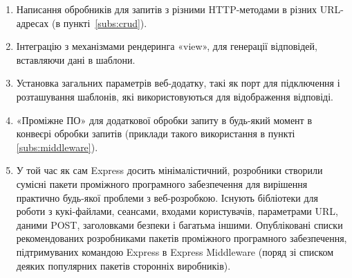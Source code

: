 \begin{enumerate}
	\item Написання обробників для запитів з різними HTTP-методами в різних URL-адресах (в пункті~\ref{subs:crud}).
	\item Інтеграцію з механізмами рендеринга «view», для генерації відповідей, вставляючи дані в шаблони.
	\item Установка загальних параметрів веб-додатку, такі як порт для підключення і розташування шаблонів, які використовуються для відображення відповіді.
	\item «Проміжне ПО» для додаткової обробки запиту в будь-який момент в конвеєрі обробки запитів (приклади такого використання в пункті \ref{subs:middleware}).
	\item У той час як сам Express досить мінімалістичний, розробники створили сумісні пакети проміжного програмного забезпечення для вирішення практично будь-якої проблеми з веб-розробкою. Існують бібліотеки для роботи з кукі-файлами, сеансами, входами користувачів, параметрами URL, даними POST, заголовками безпеки і багатьма іншими. Опубліковані списки рекомендованих розробниками пакетів проміжного програмного забезпечення, підтримуваних командою Express в Express Middleware (поряд зі списком деяких популярних пакетів сторонніх виробників).
\end{enumerate}


